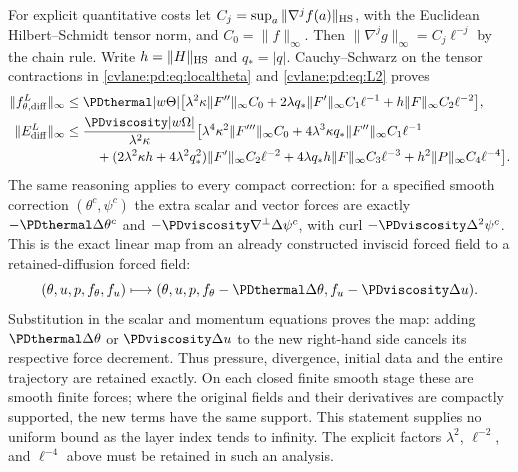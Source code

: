For explicit quantitative costs let
$C_j=\sup_a\|\nabla^jf(a)\|_{\rm HS}$, with the Euclidean
Hilbert--Schmidt tensor norm, and $C_0=\|f\|_\infty$.
Then $\|\nabla^jg\|_\infty=C_j\ell^{-j}$ by the chain rule. Write
$h=\|H\|_{\rm HS}$ and $q_*=|q|$. Cauchy--Schwarz on the tensor
contractions in \eqref{cvlane:pd:eq:localtheta} and \eqref{cvlane:pd:eq:L2} proves
\begin{align}
 \|f^L_{\theta,\mathrm{diff}}\|_\infty
 \leq{}&\PDthermal|w\Theta|\big[
 \lambda^2\kappa\|F''\|_\infty C_0
 +2\lambda q_*\|F'\|_\infty C_1\ell^{-1}
 +h\|F\|_\infty C_2\ell^{-2}\big],\label{cvlane:pd:eq:costtheta}\\
 \|E^L_{\mathrm{diff}}\|_\infty
 \leq{}&\frac{\PDviscosity|w\Omega|}{\lambda^2\kappa}\big[
 \lambda^4\kappa^2\|F'''\|_\infty C_0
 +4\lambda^3\kappa q_*\|F''\|_\infty C_1\ell^{-1}\notag\\
 &\quad+(2\lambda^2\kappa h+4\lambda^2q_*^2)
       \|F'\|_\infty C_2\ell^{-2}
 +4\lambda q_*h\|F\|_\infty C_3\ell^{-3}
 +h^2\|P\|_\infty C_4\ell^{-4}\big].\label{cvlane:pd:eq:costomega}
\end{align}
The same reasoning applies to every compact correction: for a specified
smooth correction $(\theta^c,\psi^c)$ the extra scalar and vector forces
are exactly $-\PDthermal\Delta\theta^c$ and
$-\PDviscosity\nabla^\perp\Delta\psi^c$, with curl
$-\PDviscosity\Delta^2\psi^c$. This is the exact linear map from an already
constructed inviscid forced field to a retained-diffusion forced field:
\begin{equation}\label{cvlane:pd:eq:force-map}
 (\theta,u,p,f_\theta,f_u)\longmapsto
 (\theta,u,p,f_\theta-\PDthermal\Delta\theta,
                      f_u-\PDviscosity\Delta u).
\end{equation}
Substitution in the scalar and momentum equations proves the map:
adding $\PDthermal\Delta\theta$ or $\PDviscosity\Delta u$ to the new right-hand side
cancels its respective force decrement. Thus pressure, divergence,
initial data and the entire trajectory are retained exactly. On each
closed finite smooth stage these are smooth finite forces; where the
original fields and their derivatives are compactly supported, the new
terms have the same support. This statement supplies no uniform bound
as the layer index tends to infinity. The explicit factors
$\lambda^2$, $\ell^{-2}$, and $\ell^{-4}$ above must be retained in such
an analysis.

